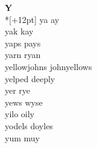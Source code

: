 \vspace{14pt}
\noindent\textbf{\Large Y}\\*[+12pt]
ya ay\\
yak kay\\
yaps pays\\
yarn ryan\\
yellowjohns johnyellows\\
yelped deeply\\
yer rye\\
yews wyse\\
yilo oily\\
yodels doyles\\
yum muy\\
